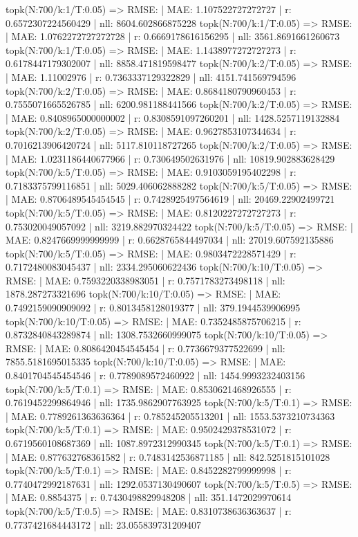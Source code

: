 topk(N:700/k:1/T:0.05) => RMSE: | MAE: 1.107522727272727 | r: 0.6572307224560429 | nll: 8604.602866875228
topk(N:700/k:1/T:0.05) => RMSE: | MAE: 1.0762272727272728 | r: 0.6669178616156295 | nll: 3561.8691661260673
topk(N:700/k:1/T:0.05) => RMSE: | MAE: 1.1438977272727273 | r: 0.6178447179302007 | nll: 8858.471819598477
topk(N:700/k:2/T:0.05) => RMSE: | MAE: 1.11002976 | r: 0.7363337129322829 | nll: 4151.741569794596
topk(N:700/k:2/T:0.05) => RMSE: | MAE: 0.8684180790960453 | r: 0.7555071665526785 | nll: 6200.981188441566
topk(N:700/k:2/T:0.05) => RMSE: | MAE: 0.8408965000000002 | r: 0.8308591097260201 | nll: 1428.5257119132884
topk(N:700/k:2/T:0.05) => RMSE: | MAE: 0.9627853107344634 | r: 0.7016213906420724 | nll: 5117.810118727265
topk(N:700/k:2/T:0.05) => RMSE: | MAE: 1.0231186440677966 | r: 0.730649502631976 | nll: 10819.902883628429
topk(N:700/k:5/T:0.05) => RMSE: | MAE: 0.9103059195402298 | r: 0.7183375799116851 | nll: 5029.406062888282
topk(N:700/k:5/T:0.05) => RMSE: | MAE: 0.8706489545454545 | r: 0.7428925497564619 | nll: 20469.22902499721
topk(N:700/k:5/T:0.05) => RMSE: | MAE: 0.8120227272727273 | r: 0.753020049057092 | nll: 3219.882970324422
topk(N:700/k:5/T:0.05) => RMSE: | MAE: 0.8247669999999999 | r: 0.6628765844497034 | nll: 27019.607592135886
topk(N:700/k:5/T:0.05) => RMSE: | MAE: 0.9803472228571429 | r: 0.7172480083045437 | nll: 2334.295060622436
topk(N:700/k:10/T:0.05) => RMSE: | MAE: 0.7593220338983051 | r: 0.7571783273498118 | nll: 1878.287273321696
topk(N:700/k:10/T:0.05) => RMSE: | MAE: 0.7492159090909092 | r: 0.8013458128019377 | nll: 379.1944539906995
topk(N:700/k:10/T:0.05) => RMSE: | MAE: 0.7352485875706215 | r: 0.8732840843289874 | nll: 1308.7532660999075
topk(N:700/k:10/T:0.05) => RMSE: | MAE: 0.8086420454545454 | r: 0.7736679377522699 | nll: 7855.5181695015335
topk(N:700/k:10/T:0.05) => RMSE: | MAE: 0.8401704545454546 | r: 0.7789089572460922 | nll: 1454.9993232403156
topk(N:700/k:5/T:0.1) => RMSE: | MAE: 0.8530621468926555 | r: 0.7619452299864946 | nll: 1735.9862907763925
topk(N:700/k:5/T:0.1) => RMSE: | MAE: 0.7789261363636364 | r: 0.785245205513201 | nll: 1553.5373210734363
topk(N:700/k:5/T:0.1) => RMSE: | MAE: 0.9502429378531072 | r: 0.6719560108687369 | nll: 1087.8972312990345
topk(N:700/k:5/T:0.1) => RMSE: | MAE: 0.877632768361582 | r: 0.7483142536871185 | nll: 842.5251815101028
topk(N:700/k:5/T:0.1) => RMSE: | MAE: 0.8452282799999998 | r: 0.7740472992187631 | nll: 1292.0537130490607
topk(N:700/k:5/T:0.5) => RMSE: | MAE: 0.8854375 | r: 0.7430498829948208 | nll: 351.1472029970614
topk(N:700/k:5/T:0.5) => RMSE: | MAE: 0.8310738636363637 | r: 0.7737421684443172 | nll: 23.055839731209407
